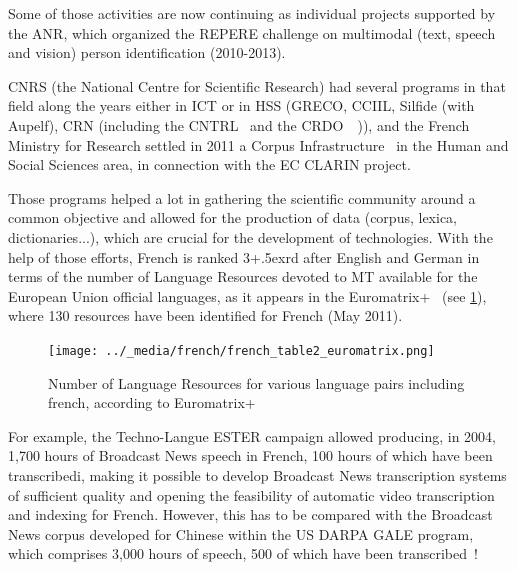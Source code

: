 \begin{multicols}{2}
Some of those activities are now
continuing as individual projects supported by the ANR, which
organized the REPERE challenge on multimodal (text, speech and vision)
person identification (2010-2013).

CNRS (the National Centre for Scientific Research) had several
programs in that field along the years either in ICT or in HSS (GRECO,
CCIIL, Silfide (with Aupelf), CRN (including the CNTRL~\cite{cnrtl} and the
CRDO~\cite{crdo}~\cite{crdo2})), and the French Ministry for Research settled in 2011 a
Corpus Infrastructure~\cite{infracorpus} in the Human and Social Sciences area, in
connection with the EC CLARIN project.

Those programs helped a lot in gathering the scientific community
around a common objective and allowed for the production of data
(corpus, lexica, dictionaries...), which are crucial for the development
of technologies. With the help of those efforts, French is ranked 3\raise+.5ex\hbox{rd}
after English and German in terms of the number of Language Resources
devoted to MT available for the European Union official languages, as
it appears in the Euromatrix+~\cite{euromatrixplus} (see \ref{fig:EuromatrixFrRessource}), where 130 resources have been identified for French (May 2011).

\begin{figure}
\begin{center}
\texttt{[image: ../\_media/french/french\_table2\_euromatrix.png]}
\caption{Number of Language Resources for various language pairs including french, according to Euromatrix+}
\label{fig:EuromatrixFrRessource}
\end{center}
\end{figure}

For example, the Techno-Langue ESTER campaign allowed producing, in
2004, 1,700 hours of Broadcast News speech in French, 100 hours of
which have been transcribedi, making it possible to develop Broadcast
News transcription systems of sufficient quality and opening the
feasibility of automatic video transcription and indexing for
French. However, this has to be compared with the Broadcast News
corpus developed for Chinese within the US DARPA GALE program, which
comprises 3,000 hours of speech, 500 of which have been transcribed~\cite{gale}!


\end{multicols}
